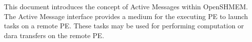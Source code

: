 
This document introduces the concept of Active 
Messages within OpenSHMEM. The Active Message
interface provides a medium for the executing PE 
to launch tasks on a remote PE. These tasks may be 
used for performing computation or dara transfers 
on the remote PE.

